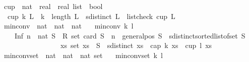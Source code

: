 \begin{isabellebody}
\isanewline
{}\isamarkupfalse%
\ cup\ {\isacharcolon}{\kern0pt}{\isacharcolon}{\kern0pt}\ {\isachardoublequoteopen}nat\ {\isasymRightarrow}\ {\isacharparenleft}{\kern0pt}real\ {\isasymtimes}\ real{\isacharparenright}{\kern0pt}\ list\ {\isasymRightarrow}\ bool{\isachardoublequoteclose}\ \isanewline
\ \ {\isachardoublequoteopen}cup\ k\ L\ {\isasymequiv}\ {\isacharparenleft}{\kern0pt}k\ {\isacharequal}{\kern0pt}\ length\ L{\isacharparenright}{\kern0pt}\ {\isasymand}\ {\isacharparenleft}{\kern0pt}sdistinct\ L{\isacharparenright}{\kern0pt}\ {\isasymand}\ {\isacharparenleft}{\kern0pt}list{\isacharunderscore}{\kern0pt}check\ cup{}\ L{\isacharparenright}{\kern0pt}{\isachardoublequoteclose}\isanewline
\isanewline
\isanewline
\isanewline
\isanewline
\isanewline
{}\isamarkupfalse%
\ min{\isacharunderscore}{\kern0pt}conv\ {\isacharcolon}{\kern0pt}{\isacharcolon}{\kern0pt}\ {\isachardoublequoteopen}nat\ {\isasymRightarrow}\ nat\ {\isasymRightarrow}\ nat{\isachardoublequoteclose}\ \isanewline
\ \ {\isachardoublequoteopen}min{\isacharunderscore}{\kern0pt}conv\ k\ l\ {\isacharequal}{\kern0pt}\ \isanewline
\ \ \ \ Inf\ {\isacharbraceleft}{\kern0pt}n\ {\isacharcolon}{\kern0pt}{\isacharcolon}{\kern0pt}\ nat{\isachardot}{\kern0pt}\ {\isacharparenleft}{\kern0pt}{\isasymforall}S\ {\isacharcolon}{\kern0pt}{\isacharcolon}{\kern0pt}\ R{}\ set{\isachardot}{\kern0pt}\ {\isacharparenleft}{\kern0pt}card\ S\ {\isasymge}\ n\ {\isasymand}\ general{\isacharunderscore}{\kern0pt}pos\ S\ {\isasymand}\ sdistinct{\isacharparenleft}{\kern0pt}sorted{\isacharunderscore}{\kern0pt}list{\isacharunderscore}{\kern0pt}of{\isacharunderscore}{\kern0pt}set\ S{\isacharparenright}{\kern0pt}{\isacharparenright}{\kern0pt}\isanewline
\ \ \ \ \ \ \ \ \ \ \ \ \ \ \ \ {\isasymlongrightarrow}\ {\isacharparenleft}{\kern0pt}{\isasymexists}xs{\isachardot}{\kern0pt}\ set\ xs\ {\isasymsubseteq}\ S\ {\isasymand}\ sdistinct\ xs\ {\isasymand}\ {\isacharparenleft}{\kern0pt}cap\ k\ xs\ {\isasymor}\ cup\ l\ xs{\isacharparenright}{\kern0pt}{\isacharparenright}{\kern0pt}{\isacharparenright}{\kern0pt}{\isacharbraceright}{\kern0pt}{\isachardoublequoteclose}\isanewline
\isanewline
{}\isamarkupfalse%
\ min{\isacharunderscore}{\kern0pt}conv{\isacharunderscore}{\kern0pt}set\ {\isacharcolon}{\kern0pt}{\isacharcolon}{\kern0pt}\ {\isachardoublequoteopen}nat\ {\isasymRightarrow}\ nat\ {\isasymRightarrow}\ nat\ set{\isachardoublequoteclose}\ \isanewline
\ \ {\isachardoublequoteopen}min{\isacharunderscore}{\kern0pt}conv{\isacharunderscore}{\kern0pt}set\ k\ l\ {\isacharequal}{\kern0pt}\ \isanewline

\end{isabellebody}
